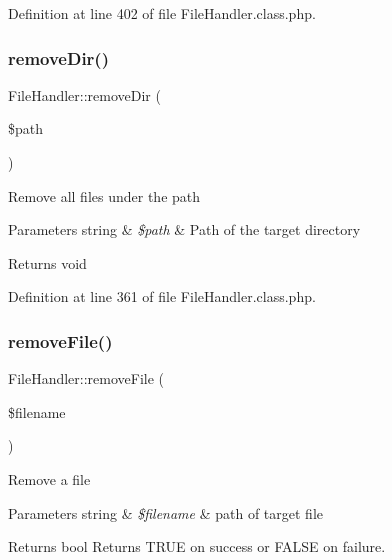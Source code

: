 Definition at line 402 of file File\+Handler.\+class.\+php.

\hypertarget{classFileHandler_a55015d030d3773d96281b0fa4bda986e}{}\label{classFileHandler_a55015d030d3773d96281b0fa4bda986e} 
\subsubsection{\texorpdfstring{remove\+Dir()}{removeDir()}}
{\footnotesize\ttfamily File\+Handler\+::remove\+Dir (\begin{DoxyParamCaption}\item[{}]{\$path }\end{DoxyParamCaption})}

Remove all files under the path


\begin{DoxyParams}[1]{Parameters}
string & {\em \$path} & Path of the target directory \\
\hline
\end{DoxyParams}
\begin{DoxyReturn}{Returns}
void 
\end{DoxyReturn}


Definition at line 361 of file File\+Handler.\+class.\+php.

\hypertarget{classFileHandler_aa5969f9fe0ce869fc736c4da384959e9}{}\label{classFileHandler_aa5969f9fe0ce869fc736c4da384959e9} 
\subsubsection{\texorpdfstring{remove\+File()}{removeFile()}}
{\footnotesize\ttfamily File\+Handler\+::remove\+File (\begin{DoxyParamCaption}\item[{}]{\$filename }\end{DoxyParamCaption})}

Remove a file


\begin{DoxyParams}[1]{Parameters}
string & {\em \$filename} & path of target file \\
\hline
\end{DoxyParams}
\begin{DoxyReturn}{Returns}
bool Returns T\+R\+UE on success or F\+A\+L\+SE on failure. 
\end{DoxyReturn}


